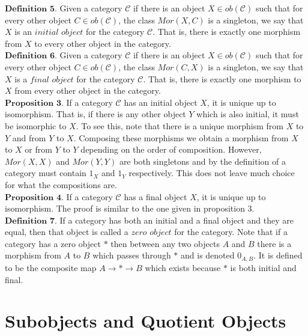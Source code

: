 \documentclass{article}
\theoremstyle{problemstyle}
\begin{document}
$\textbf{Definition 5.}$ Given a category $\mathcal{C}$ if there is an object $X \in ob(\mathcal{C})$ such that for every other object $C \in ob(\mathcal{C})$, the class $Mor(X,C)$ is a singleton, we say that $X$ is an $initial$ $object$ for the category $\mathcal{C}$. That is, there is exactly one morphism from $X$ to every other object in the category.\\ 

$\textbf{Definition 6.}$ Given a category $\mathcal{C}$ if there is an object $X \in ob(\mathcal{C})$ such that for every other object $C \in ob(\mathcal{C})$, the class $Mor(C,X)$ is a singleton, we say that $X$ is a $final$ $object$ for the category $\mathcal{C}$. That is, there is exactly one morphism to $X$ from every other object in the category.\\ 

$\textbf{Proposition 3.}$ If a category $\mathcal{C}$ has an initial object $X$, it is unique up to isomorphism. That is, if there is any other object $Y$ which is also initial, it must be isomorphic to $X$.  To see this, note that there is a unique morphism from $X$ to $Y$ and from $Y$ to $X$. Composing these morphisms we obtain a morphism from $X$ to $X$ or from $Y$ to $Y$ depending on the order of composition. However, $Mor(X,X)$ and $Mor(Y,Y)$ are both singletons and by the definition of a category must contain $1_X$ and $1_Y$ respectively. This does not leave much choice for what the compositions are.\\

$\textbf{Proposition 4.}$ If a category $\mathcal{C}$ has a final object $X$, it is unique up to isomorphism. The proof is similar to the one given in proposition 3. \\

$\textbf{Definition 7.}$ If a category has both an initial and a final object and they are equal, then that object is called a $zero$ $object$ for the category. Note that if a category has a zero object $*$ then between any two objects $A$ and $B$ there is a morphism from $A$ to $B$ which passes through $*$ and is denoted $0_{A,B}$. It is defined to be the composite map $A \rightarrow * \rightarrow B$ which exists because $*$ is both initial and final. \\

\section{Subobjects and Quotient Objects}
\end{document}
